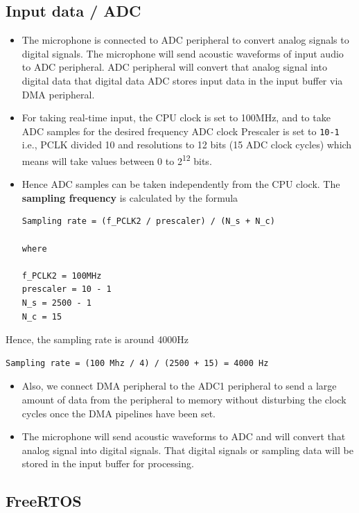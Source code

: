\documentclass[11pt]{article}
\begin{document}
\subsection{Input data / ADC}
\label{sec:org1cd3647}

\begin{itemize}
\item The microphone is connected to ADC peripheral to convert analog signals to digital signals. The microphone will send acoustic waveforms of input audio to ADC peripheral. ADC peripheral will convert that analog signal into digital data that digital data ADC stores input data in the input buffer via DMA peripheral.
\item For taking real-time input, the CPU clock is set to 100MHz, and to take ADC samples for the desired frequency ADC clock Prescaler is set to \texttt{10-1} i.e., PCLK divided 10 and resolutions to 12 bits (15 ADC clock cycles) which means will take values between 0 to 2\textsuperscript{12} bits.
\item Hence ADC samples can be taken independently from the CPU clock. The \textbf{sampling frequency} is calculated by the formula

\begin{verbatim}
Sampling rate = (f_PCLK2 / prescaler) / (N_s + N_c)

where

f_PCLK2 = 100MHz
prescaler = 10 - 1
N_s = 2500 - 1
N_c = 15

\end{verbatim}
\end{itemize}

Hence, the sampling rate is around 4000Hz

\begin{verbatim}
Sampling rate = (100 Mhz / 4) / (2500 + 15) = 4000 Hz
\end{verbatim}

\begin{itemize}
\item Also, we connect DMA peripheral to the ADC1 peripheral to send a large amount of data from the peripheral to memory without disturbing the clock cycles once the DMA pipelines have been set.
\item The microphone will send acoustic waveforms to ADC and will convert that analog signal into digital signals. That digital signals or sampling data will be stored in the input buffer for processing.
\end{itemize}

\subsection{FreeRTOS}
\label{sec:org13adad4}
\end{document}
